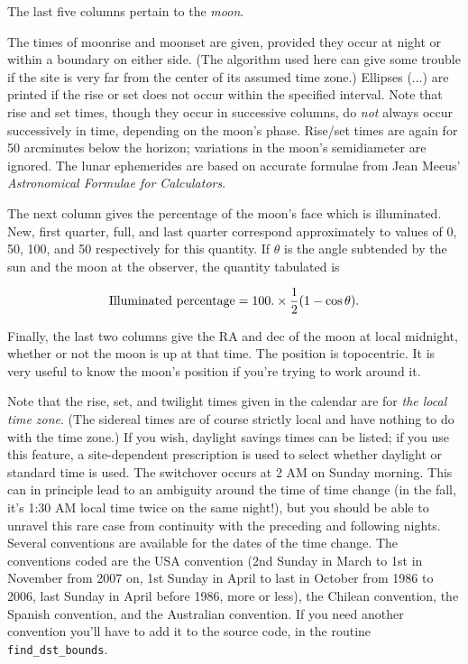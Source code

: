 The last five columns pertain to the {\it moon}.  

The times of moonrise and moonset are given, provided they 
occur at night or within a boundary on either side.  (The algorithm
used here can give some trouble if the site is very far from the
center of its assumed time zone.)
Ellipses ($\ldots$) are printed if
the rise or set does not occur within the specified interval.  Note
that rise and set times, though they occur in successive columns,
do {\it not} always occur successively in time, depending on the moon's
phase.  Rise/set times are again for 50 arcminutes below the horizon;
variations in the moon's semidiameter are ignored.  The lunar ephemerides 
are based on accurate formulae from Jean Meeus' {\it Astronomical
Formulae for Calculators}.

The next column gives the percentage of the moon's face which is
illuminated.  New, first quarter, full, and last quarter
correspond approximately to values of 0, 50, 100, and 50
respectively for this quantity.  If $\theta$ is the angle subtended by
the sun and the moon at the observer, the quantity tabulated is

$$\hbox{Illuminated percentage} = 100. \times {1 \over 2}(1 - \cos \theta ).$$

Finally, the last two columns give the RA and dec of the moon at local
midnight, whether or not the moon is up at that time.  The position
is topocentric.  It is very useful to know the moon's position 
if you're trying to work around it.


Note that the rise, set, and twilight times given in the calendar 
are for {\it the local time zone}.  (The sidereal times are of course 
strictly local and have nothing to do with the time zone.)  If 
you wish, daylight savings times can be listed; if you use
this feature, a site-dependent prescription is used to select
whether daylight or standard time is used.  The
switchover occurs at 2 AM on Sunday morning.  This can in principle
lead to an ambiguity around the time of time change (in the fall,
it's 1:30 AM local time twice on the same night!), but you should
be able to unravel this rare case from continuity with the
preceding and following nights.  Several conventions are
available for the dates of the time change.
The conventions coded are the USA convention (2nd Sunday 
in March to 1st in November from 2007 on, 1st
Sunday in April to last in October from 1986 to 2006, last Sunday in April
before 1986, more or less), the Chilean convention, the 
Spanish convention, and the Australian convention.  If you need 
another convention you'll have to
add it to the source code, in the routine {\tt find\_dst\_bounds}.

